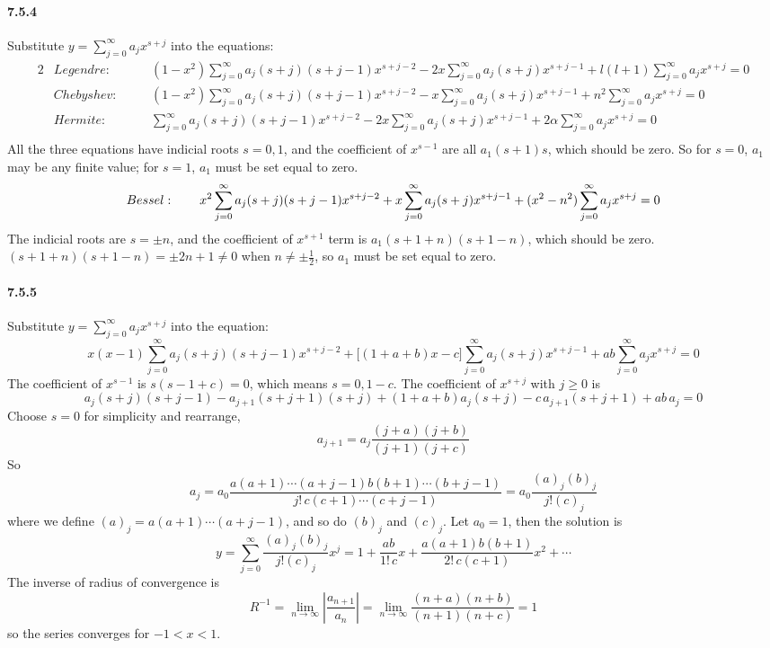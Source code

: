 \documentclass[a4paper]{article}
\begin{document}
\paragraph{7.5.4}
Substitute $y=\sum_{j=0}^\infty a_jx^{s+j}$ into the equations:
\begin{alignat*}{2}
    &Legendre:\quad && (1-x^2)\sum_{j=0}^\infty a_j(s+j)(s+j-1)x^{s+j-2}-2x\sum_{j=0}^\infty a_j(s+j)x^{s+j-1}+l(l+1)\sum_{j=0}^\infty a_jx^{s+j}=0\\
    &Chebyshev:\quad && (1-x^2)\sum_{j=0}^\infty a_j(s+j)(s+j-1)x^{s+j-2}-x\sum_{j=0}^\infty a_j(s+j)x^{s+j-1}+n^2\sum_{j=0}^\infty a_jx^{s+j}=0\\
    &Hermite:\quad && \sum_{j=0}^\infty a_j(s+j)(s+j-1)x^{s+j-2}-2x\sum_{j=0}^\infty a_j(s+j)x^{s+j-1}+2\alpha\sum_{j=0}^\infty a_jx^{s+j}=0\\
\end{alignat*}
All the three equations have indicial roots $s=0,1$, and the coefficient of $x^{s-1}$ are all $a_1(s+1)s$, which should be zero. So for $s=0$, $a_1$ may be any finite value; for $s=1$, $a_1$ must be set equal to zero.
\[
Bessel:\qquad x^2\sum_{j=0}^\infty a_j(s+j)(s+j-1)x^{s+j-2}+x\sum_{j=0}^\infty a_j(s+j)x^{s+j-1}+(x^2-n^2)\sum_{j=0}^\infty a_jx^{s+j}=0\\
\]
The indicial roots are $s=\pm n$, and the coefficient of $x^{s+1}$ term is $a_1(s+1+n)(s+1-n)$, which should be zero. $(s+1+n)(s+1-n)=\pm2n+1\neq0$ when $n\neq\pm\frac{1}{2}$, so $a_1$ must be set equal to zero.

\paragraph{7.5.5}
Substitute $y=\sum_{j=0}^\infty a_jx^{s+j}$ into the equation:
\[
x(x-1)\sum_{j=0}^\infty a_j(s+j)(s+j-1)x^{s+j-2}+\big[(1+a+b)x-c \big]\sum_{j=0}^\infty a_j(s+j)x^{s+j-1}+ab\sum_{j=0}^\infty a_jx^{s+j}=0
\]
The coefficient of $x^{s-1}$ is $s(s-1+c)=0$, which means $s=0,1-c$. The coefficient of $x^{s+j}$ with $j\geq0$ is 
\[
a_j(s+j)(s+j-1)-a_{j+1}(s+j+1)(s+j)+(1+a+b)a_j(s+j)-c\,a_{j+1}(s+j+1)+ab\,a_j=0
\]
Choose $s=0$ for simplicity and rearrange,
\[
a_{j+1}=a_j\frac{(j+a)(j+b)}{(j+1)(j+c)}
\]
So
\[
a_j=a_0\frac{a(a+1)\cdots(a+j-1)b(b+1)\cdots(b+j-1)}{j!\,c(c+1)\cdots(c+j-1)}=a_0\frac{(a)_j(b)_j}{j!(c)_j}
\]
where we define $(a)_j=a(a+1)\cdots(a+j-1)$, and so do $(b)_j$ and $(c)_j$.
Let $a_0=1$, then the solution is 
\[
y=\sum_{j=0}^\infty\frac{(a)_j(b)_j}{j!(c)_j}x^j=1+\frac{ab}{1!\,c}x+\frac{a(a+1)b(b+1)}{2!\,c(c+1)}x^2+\cdots
\]
The inverse of radius of convergence is
\[
R^{-1}=\lim_{n\to\infty}\left|\frac{a_{n+1}}{a_n}\right|=\lim_{n\to\infty}\frac{(n+a)(n+b)}{(n+1)(n+c)}=1 
\]
so the series converges for $-1<x<1$. 
\end{document}
